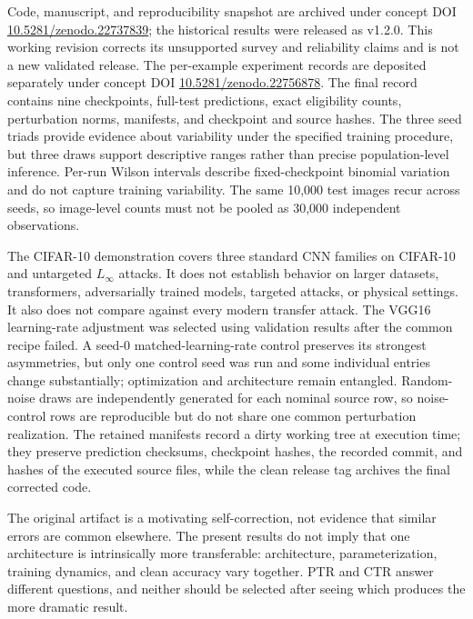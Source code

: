 \documentclass[10pt]{article}
\begin{document}
Code, manuscript, and reproducibility snapshot are archived under concept DOI \href{https://doi.org/10.5281/zenodo.22737839}{10.5281/zenodo.22737839}; the historical results were released as v1.2.0. This working revision corrects its unsupported survey and reliability claims and is not a new validated release. The per-example experiment records are deposited separately under concept DOI \href{https://doi.org/10.5281/zenodo.22756878}{10.5281/zenodo.22756878}. The final record contains nine checkpoints, full-test predictions, exact eligibility counts, perturbation norms, manifests, and checkpoint and source hashes. The three seed triads provide evidence about variability under the specified training procedure, but three draws support descriptive ranges rather than precise population-level inference. Per-run Wilson intervals describe fixed-checkpoint binomial variation and do not capture training variability. The same 10,000 test images recur across seeds, so image-level counts must not be pooled as 30,000 independent observations.

The CIFAR-10 demonstration covers three standard CNN families on CIFAR-10 and untargeted $L_\infty$ attacks. It does not establish behavior on larger datasets, transformers, adversarially trained models, targeted attacks, or physical settings. It also does not compare against every modern transfer attack. The VGG16 learning-rate adjustment was selected using validation results after the common recipe failed. A seed-0 matched-learning-rate control preserves its strongest asymmetries, but only one control seed was run and some individual entries change substantially; optimization and architecture remain entangled. Random-noise draws are independently generated for each nominal source row, so noise-control rows are reproducible but do not share one common perturbation realization. The retained manifests record a dirty working tree at execution time; they preserve prediction checksums, checkpoint hashes, the recorded commit, and hashes of the executed source files, while the clean release tag archives the final corrected code.

The original artifact is a motivating self-correction, not evidence that similar errors are common elsewhere. The present results do not imply that one architecture is intrinsically more transferable: architecture, parameterization, training dynamics, and clean accuracy vary together. PTR and CTR answer different questions, and neither should be selected after seeing which produces the more dramatic result.
\end{document}

